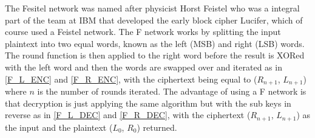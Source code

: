 \documentclass[12pt,twoside,a4paper]{report}
\begin{document}
	The Fesitel network was named after physicist Horst Feistel who was a integral part of the team at IBM that developed the early block cipher Lucifer, which of course used a Feistel network. The F network works by splitting the input plaintext into two equal words, known as the left (MSB) and right (LSB) words. The round function is then applied to the right word before the result is XORed with the left word and then the words are swapped over and iterated as in \autoref{F_L_ENC} and \ref{F_R_ENC}, with the ciphertext being equal to ($R_{n+1}$, $L_{n+1}$) where $n$ is the number of rounds iterated. The advantage of using a F network is that decryption is just applying the same algorithm but with the sub keys in reverse as in \autoref{F_L_DEC} and \ref{F_R_DEC}, with the ciphertext ($R_{n+1}$, $L_{n+1}$) as the input and the plaintext ($L_0$, $R_0$) returned.
    
\end{document}
